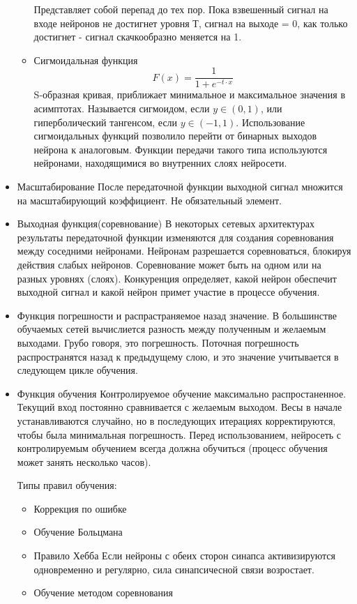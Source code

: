 \begin{itemize}
\begin{itemize}
    					Представляет собой перепад до тех пор. Пока взвешенный сигнал на входе нейронов не достигнет 
    					уровня Т, сигнал на выходе = 0, как только достигнет - сигнал скачкообразно меняется на 1.
    				\item Сигмоидальная функция
    					\[F(x) = \frac{1}{1 + e^{-t \cdot x}}\]
    					S-образная кривая, приближает минимальное и максимальное значения в асимптотах. Называется сигмоидом, 
    					если $y \in (0, 1)$, или гиперболический тангенсом, если $y \in (-1, 1)$.
    					Использование сигмоидальных функций позволило перейти от бинарных выходов нейрона к аналоговым. 
    					Функции передачи такого типа используются нейронами, находящимися во внутренних слоях нейросети.
    				\end{itemize}
    			    \item Масштабирование 
    				После передаточной функции выходной сигнал множится на масштабирующий коэффициент. Не обязательный элемент.
    			    \item Выходная функция(соревнование)
    				В некоторых сетевых архитектурах результаты передаточной функции изменяются для создания соревнования 
    				между соседними нейронами. Нейронам разрешается соревноваться, блокируя действия слабых нейронов. Соревнование 
    				может быть на одном или на разных уровнях (слоях). Конкуренция определяет, какой нейрон обеспечит выходной
    				сигнал и какой нейрон примет участие в процессе обучения. 
    			    \item Функция погрешности и распрастраняемое назад значение. 
    				В большинстве обучаемых сетей вычислиется разность между полученным и желаемым выходами. Грубо говоря, это
    				погрешность. Поточная погрешность распространятся назад к предыдущему слою, и это значение учитывается в 
    				следующем цикле обучения. 
    			    \item Функция обучения 
    				Контролируемое обучение максимально распростаненное. Текущий вход постоянно сравнивается с желаемым выходом. 
    				Весы в начале устанавливаются случайно, но в последующих итерациях корректируются, чтобы была минимальная 
    				погрешность. 
    				Перед использованием, нейросеть с контролируемым обучением всегда должна обучиться (процесс обучения может занять несколько часов).
    				
    				Типы правил обучения:
    				    \begin{itemize}
    				        \item Коррекция по ошибке
    					    \item Обучение Больцмана
    					    \item Правило Хебба
    						    Если нейроны с обеих сторон синапса активизируются одновременно и регулярно, сила синапсичесной связи 
    						возростает. 
    					    \item Обучение методом соревнования
    				    \end{itemize}
    		\end{itemize}
					
